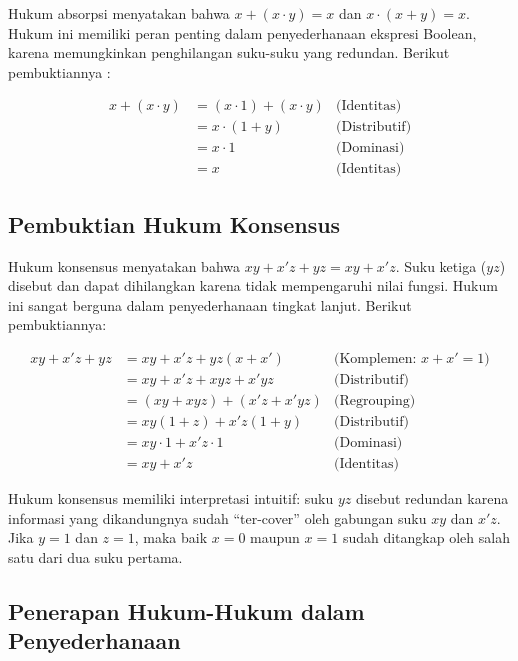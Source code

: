 Hukum absorpsi menyatakan bahwa $x + (x \cdot y) = x$ dan $x \cdot (x + y) = x$. Hukum ini memiliki peran penting dalam penyederhanaan ekspresi Boolean, karena memungkinkan penghilangan suku-suku yang redundan. Berikut pembuktiannya \cite{rosen2019}:

\begin{align*}
x + (x \cdot y) &= (x \cdot 1) + (x \cdot y) & \text{(Identitas)} \\
                 &= x \cdot (1 + y) & \text{(Distributif)} \\
                 &= x \cdot 1 & \text{(Dominasi)} \\
                 &= x & \text{(Identitas)}
\end{align*}

\subsection{Pembuktian Hukum Konsensus}

Hukum konsensus menyatakan bahwa $xy + x'z + yz = xy + x'z$. Suku ketiga ($yz$) disebut  dan dapat dihilangkan karena tidak mempengaruhi nilai fungsi. Hukum ini sangat berguna dalam penyederhanaan tingkat lanjut. Berikut pembuktiannya:

\begin{align*}
xy + x'z + yz &= xy + x'z + yz(x + x') & \text{(Komplemen: } x + x' = 1) \\
              &= xy + x'z + xyz + x'yz & \text{(Distributif)} \\
              &= (xy + xyz) + (x'z + x'yz) & \text{(Regrouping)} \\
              &= xy(1 + z) + x'z(1 + y) & \text{(Distributif)} \\
              &= xy \cdot 1 + x'z \cdot 1 & \text{(Dominasi)} \\
              &= xy + x'z & \text{(Identitas)}
\end{align*}

\begin{konsep}
Hukum konsensus memiliki interpretasi intuitif: suku $yz$ disebut redundan karena informasi yang dikandungnya sudah ``ter-cover'' oleh gabungan suku $xy$ dan $x'z$. Jika $y = 1$ dan $z = 1$, maka baik $x = 0$ maupun $x = 1$ sudah ditangkap oleh salah satu dari dua suku pertama.
\end{konsep}

\subsection{Penerapan Hukum-Hukum dalam Penyederhanaan}

